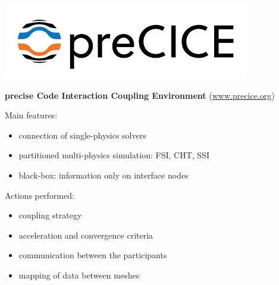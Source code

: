 \documentclass[10pt,t]{beamer}
\begin{document}
\begin{frame}{\includegraphics[width=.22\textwidth]{images/precice.png}}

\textbf{\textcolor{dorange}{pre}cise \textcolor{pblue}{C}ode \textcolor{pblue}{I}nteraction \textcolor{pblue}{C}oupling \textcolor{pblue}{E}nvironment} (\url{www.precice.org})

\vspace{5mm}

Main features:

    \begin{itemize}
        \item connection of single-physics solvers
        \item partitioned multi-physics simulation: FSI, CHT, SSI
        \item black-box: information only on interface nodes 
    \end{itemize}

\pause
\vspace{5mm}

Actions performed: 

\begin{itemize}
	\item coupling strategy
	\item acceleration and convergence criteria
	\item communication between the participants
	\item mapping of data between meshes 
\end{itemize}

\end{frame}
\end{document}
